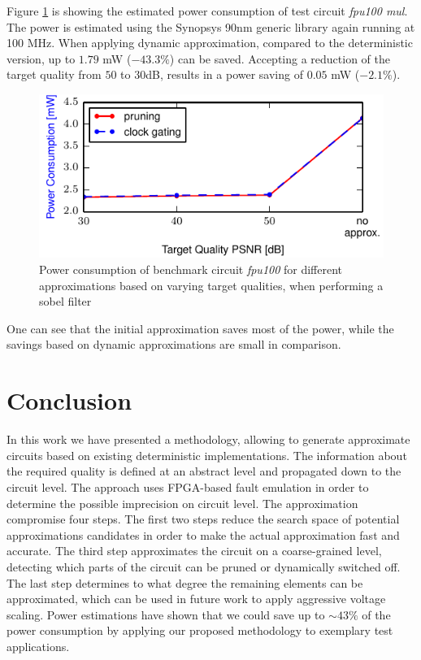 \documentclass[conference]{IEEEtran}
\begin{document}
Figure \ref{fig:power_fpu} is showing the estimated power consumption of test circuit \emph{fpu100 mul}. The power is estimated using the Synopsys 90nm generic library again running at 100 MHz. When applying dynamic approximation, compared to the deterministic version, up to $1.79$ mW ($-43.3\%$) can be saved. Accepting a reduction of the target quality from $50$ to $30$dB, results in a power saving of $0.05$ mW ($-2.1\%$).
\begin{figure}[htb]
  \centering
  \includegraphics[width=.5\textwidth]{figs/power_fpu}
  \caption{Power consumption of benchmark circuit \emph{fpu100} for different approximations based on varying target qualities, when performing a sobel filter}
  \label{fig:power_fpu}
\end{figure}
One can see that the initial approximation saves most of the power, while the savings based on dynamic approximations are small in comparison. 

\section{Conclusion}
\label{sec:conclusion}
In this work we have presented a methodology, allowing to generate approximate circuits based on existing deterministic implementations. The information about the required quality is defined at an abstract level and propagated down to the circuit level. The approach uses FPGA-based fault emulation in order to determine the possible imprecision on circuit level. The approximation compromise four steps. The first two steps reduce the search space of potential approximations candidates in order to make the actual approximation fast and accurate. The third step approximates the circuit on a coarse-grained level, detecting which parts of the circuit can be pruned or dynamically switched off. The last step determines to what degree the remaining elements can be approximated, which can be used in future work to apply aggressive voltage scaling. Power estimations have shown that we could save up to $\sim43\%$ of the power consumption by applying our proposed methodology to exemplary test applications.
\end{document}
